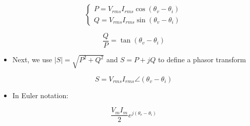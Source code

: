 \begin{itemize}
    $$\left\{\begin{array}{c} P=V_{rms}I_{rms}\cos(\theta_v-\theta_i)\\ Q=V_{rms}I_{rms}\sin(\theta_v-\theta_i)\end{array}$$

    $$\frac{Q}{P}=\tan(\theta_v-\theta_i)$$

  \item Next, we use $|S|=\sqrt{P^2+Q^2}$ and $S=P+jQ$ to define a phasor transform

    $$S=V_{rms}I_{rms}\angle{(\theta_v-\theta_i)}$$

  \item In Euler notation:

    $$\frac{V_mI_m}{2}e^{j(\theta_v-\theta_i)}$$

\end{itemize}



